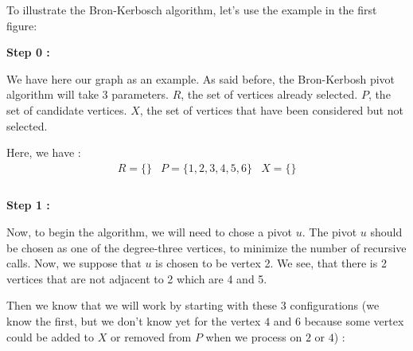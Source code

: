 To illustrate the Bron-Kerbosch algorithm, let's use the example in the 
first figure: \newline

\hspace*{1cm} \textbf{Step 0 :}
\\
\begin{minipage}{0.4\textwidth}
\end{minipage}
\begin{minipage}{0.6\textwidth}
    We have here our graph as an example. As said before, the Bron-Kerbosh pivot algorithm will take 3 parameters. $R$, the set of vertices already selected. $P$, the set of candidate vertices. $X$, the set of vertices that have been considered but not selected.
\end{minipage}
Here, we have :
$$ \boxed{
        \begin{array}{lll}
            R = \{\} & P = \{1,2,3,4,5,6\} & X = \{\} \\
        \end{array}
    }$$
\\
\hspace*{1cm}  \textbf{Step 1 :}
\\
\begin{minipage}{0.4\textwidth}
\end{minipage}
\begin{minipage}{0.6\textwidth}
    Now, to begin the algorithm, we will need to chose a pivot $u$. The pivot $u$ should be chosen as one of the degree-three vertices, to minimize the number of recursive calls. Now, we suppose that $u$ is chosen to be vertex 2. We see, that there is 2 vertices that are not adjacent to 2 which are 4 and 5.
\end{minipage}
Then we know that we will work by starting with these 3 configurations (we know the first, but we don't know yet for the vertex $4$ and $6$ because some vertex could be added to $X$ or removed from $P$ when we process on $2$ or $4$) :
